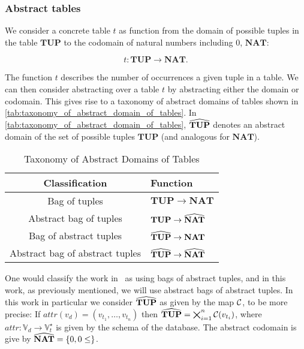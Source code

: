 \subsubsection{Abstract tables}\label{subsubsec:abstract_domain_of_tables}
We consider a concrete table $t$ as function from the domain of possible tuples in the table $\mathbf{TUP}$ to the codomain of natural numbers including $0$, $\mathbf{NAT}$:


\begin{equation}
    t : \mathbf{TUP} \rightarrow \mathbf{NAT}.\label{eq:equation-tup-nat}
\end{equation}


The function $t$ describes the number of occurrences a given tuple in a table.
We can then consider abstracting over a table $t$ by abstracting either the domain or codomain.
This gives rise to a taxonomy of abstract domains of tables shown in \autoref{tab:taxonomy_of_abstract_domain_of_tables}.
In \autoref{tab:taxonomy_of_abstract_domain_of_tables}, $\widehat{\mathbf{TUP}}$ denotes an abstract domain of the set of possible tuples $\mathbf{TUP}$ (and analogous for $\mathbf{NAT}$).


\begin{table}
    \renewcommand{\arraystretch}{1.3}
    \caption{Taxonomy of Abstract Domains of Tables}
    \centering
    \begin{tabular}{c|l}
        \toprule
        Classification                  & Function                                \\ \midrule
        Bag of tuples                   & $\mathbf{TUP} \rightarrow \mathbf{NAT}$           \\
        Abstract bag of tuples          & $\mathbf{TUP} \rightarrow \widehat{\mathbf{NAT}}$      \\
        Bag of abstract tuples          & $\widehat{\mathbf{TUP}} \rightarrow \mathbf{NAT}$      \\
        Abstract bag of abstract tuples & $\widehat{\mathbf{TUP}} \rightarrow \widehat{\mathbf{NAT}}$ \\ \bottomrule
    \end{tabular}
    \label{tab:taxonomy_of_abstract_domain_of_tables}
\end{table}

One would classify the work in~\cite{halder_abstract_2012} as using bags of abstract tuples, and in this work, as previously mentioned, we will use abstract bags of abstract tuples.
In this work in particular we consider $\widehat{\mathbf{TUP}}$ as given by the map $\mathcal{C}$, to be more precise:
If $attr(v_d) = (v_{t_1}, \dots, v_{t_n})$ then $\widehat{\mathbf{TUP}} = \bigtimes_{i = 1}^n \mathcal{C}(v_{t_i})$, where $attr : \mathbb{V}_d \rightarrow \mathbb{V}_t^\star$ is given by the schema of the database.
The abstract codomain is give by $\widehat{\mathbf{NAT}} = \{0, 0 \leq\}$.

